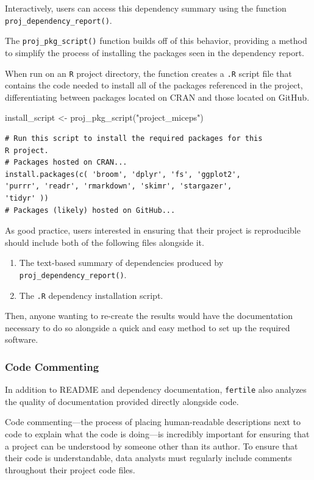 \documentclass[12pt,twoside]{reedthesis}
\newenvironment{Shaded}{\begin{snugshade}}{\end{snugshade}}
\newcommand{\FunctionTok}[1]{\textcolor[rgb]{0.00,0.00,0.00}{#1}}
\newcommand{\NormalTok}[1]{#1}
\newcommand{\OtherTok}[1]{\textcolor[rgb]{0.56,0.35,0.01}{#1}}
\newcommand{\StringTok}[1]{\textcolor[rgb]{0.31,0.60,0.02}{#1}}
\providecommand{\tightlist}{%
  \setlength{\itemsep}{0pt}\setlength{\parskip}{0pt}}
\begin{document}
Interactively, users can access this dependency summary using the function \texttt{proj\_dependency\_report()}.

The \texttt{proj\_pkg\_script()} function builds off of this behavior, providing a method to simplify the process of installing the packages seen in the dependency report.

When run on an \texttt{R} project directory, the function creates a \texttt{.R} script file that contains the code needed to install all of the packages referenced in the project, differentiating between packages located on CRAN and those located on GitHub.
\begin{Shaded}
\begin{Highlighting}[]
\NormalTok{install\_script }\OtherTok{\textless{}{-}} \FunctionTok{proj\_pkg\_script}\NormalTok{(}\StringTok{"project\_miceps"}\NormalTok{)}
\end{Highlighting}
\end{Shaded}
\begin{verbatim}
# Run this script to install the required packages for this
R project.
# Packages hosted on CRAN...
install.packages(c( 'broom', 'dplyr', 'fs', 'ggplot2',
'purrr', 'readr', 'rmarkdown', 'skimr', 'stargazer',
'tidyr' ))
# Packages (likely) hosted on GitHub...
\end{verbatim}
As good practice, users interested in ensuring that their project is reproducible should include both of the following files alongside it.
\begin{enumerate}
\def\labelenumi{\arabic{enumi}.}
\tightlist
\item
  The text-based summary of dependencies produced by \texttt{proj\_dependency\_report()}.
\item
  The \texttt{.R} dependency installation script.
\end{enumerate}
Then, anyone wanting to re-create the results would have the documentation necessary to do so alongside a quick and easy method to set up the required software.

\hypertarget{code-commenting}{%
\subsubsection{Code Commenting}\label{code-commenting}}

In addition to README and dependency documentation, \texttt{fertile} also analyzes the quality of documentation provided directly alongside code.

Code commenting---the process of placing human-readable descriptions next to code to explain what the code is doing---is incredibly important for ensuring that a project can be understood by someone other than its author. To ensure that their code is understandable, data analysts must regularly include comments throughout their project code files.
\end{document}
